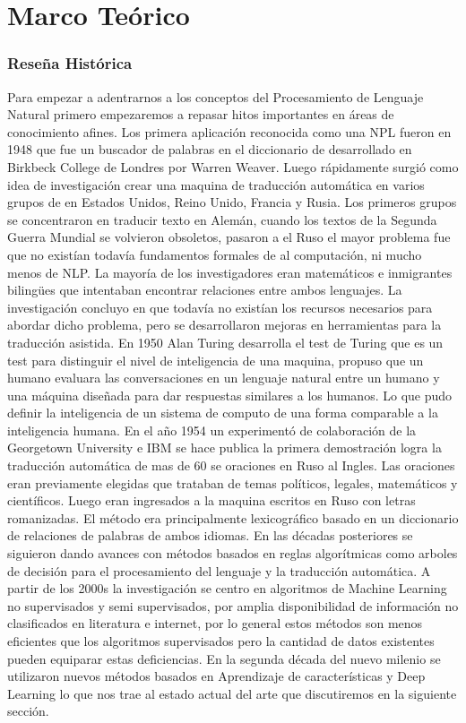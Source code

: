 \chapter[Revisión de literatura]{Marco Teórico}

\subsection[Reseña Histórica]{Reseña Histórica}
Para empezar a adentrarnos a los conceptos del Procesamiento de Lenguaje Natural primero
empezaremos a repasar hitos importantes en áreas de conocimiento afines.
Los primera aplicación reconocida como una NPL fueron en 1948 que fue un buscador de palabras en el
diccionario de desarrollado en Birkbeck College de Londres por Warren Weaver. Luego rápidamente
surgió como idea de investigación crear una maquina de traducción automática en varios grupos de en
Estados Unidos, Reino Unido, Francia y Rusia. Los primeros grupos se concentraron en traducir texto
en Alemán, cuando los textos de la Segunda Guerra Mundial se volvieron obsoletos, pasaron a el Ruso
el mayor problema fue que no existían todavía fundamentos formales de al computación, ni mucho
menos de NLP. La mayoría de los investigadores eran matemáticos e inmigrantes bilingües que
intentaban encontrar relaciones entre ambos lenguajes. La investigación concluyo en que todavía no
existían los recursos necesarios para abordar dicho problema, pero se desarrollaron mejoras en
herramientas para la traducción asistida.\cite{hancox}
En 1950 Alan Turing desarrolla el test de Turing que es un test para distinguir el nivel de
inteligencia de una maquina, propuso que un humano evaluara las conversaciones en un lenguaje
natural entre un humano y una máquina diseñada para dar respuestas similares a los humanos. Lo que
pudo definir la inteligencia de un sistema de computo de una forma comparable a la inteligencia
humana.
En el año 1954 un experimentó de colaboración de la Georgetown University e IBM se  hace publica la
primera demostración logra la traducción automática de mas de 60 se oraciones en Ruso al Ingles.
Las oraciones eran previamente elegidas que trataban de temas políticos, legales, matemáticos y
científicos. Luego eran ingresados a la maquina escritos en Ruso con letras romanizadas. El método
era principalmente lexicográfico basado en un diccionario de relaciones de palabras de ambos
idiomas.\cite{ibm_2003}
En las décadas posteriores se siguieron dando avances con métodos basados en reglas algorítmicas
como arboles de decisión para el procesamiento del lenguaje y la traducción automática. A partir de
los 2000s la investigación se centro en algoritmos de Machine Learning no supervisados y semi
supervisados, por amplia disponibilidad de información no clasificados en literatura e internet,
por lo general estos métodos son menos eficientes que los algoritmos supervisados pero la cantidad
de datos existentes pueden equiparar estas deficiencias. En la segunda década del nuevo milenio se
utilizaron nuevos métodos basados en Aprendizaje de características y Deep Learning lo que nos trae
al estado actual del arte que discutiremos en la siguiente sección.

